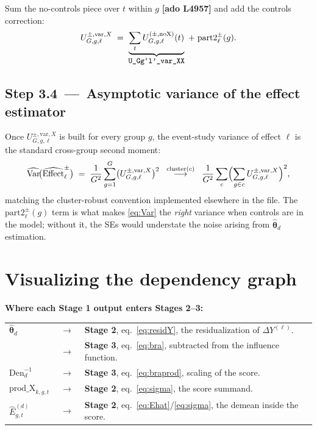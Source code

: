 \documentclass[11pt]{article}
\newcommand{\code}[1]{\texttt{\small #1}}
\newcommand{\Adoref}[1]{\textcolor{accent}{\footnotesize\textbf{[ado L#1]}}}
\newcommand{\1}{\mathbb{1}}
\newcommand{\thetad}{\widehat{\bm{\theta}}_d}
\begin{document}
Sum the no-controls piece over $t$ within $g$ \Adoref{4957} and add the
controls correction:
\begin{equation}
U^{\pm,\mathrm{var},X}_{G,g,\ell} \;=\; \underbrace{\sum_{t} U^{(\pm,\mathrm{noX})}_{G,g,\ell}(t)}_{\text{\code{U\_Gg`l'\_var\_XX}}} \;+\; \mathrm{part2}^{\pm}_{\ell}(g).
\label{eq:UvarX}
\end{equation}

\subsection*{Step 3.4 \,---\, Asymptotic variance of the effect estimator}

Once $U^{\pm,\mathrm{var},X}_{G,g,\ell}$ is built for every group $g$, the
event-study variance of effect $\ell$ is the standard cross-group second
moment:
\begin{equation}
\widehat{\mathrm{Var}}\!\bigl(\widehat{\mathrm{Effect}}^{\pm}_{\ell}\bigr) \;=\; \frac{1}{G^{2}}\sum_{g=1}^{G} \bigl(U^{\pm,\mathrm{var},X}_{G,g,\ell}\bigr)^{2}
\;\;\stackrel{\text{cluster}(c)}{\longrightarrow}\;\;
\frac{1}{G^{2}}\sum_{c} \Bigl(\sum_{g\in c} U^{\pm,\mathrm{var},X}_{G,g,\ell}\Bigr)^{2},
\label{eq:Var}
\end{equation}
matching the cluster-robust convention implemented elsewhere in the file. The
$\mathrm{part2}^{\pm}_{\ell}(g)$ term is what makes \eqref{eq:Var} the
\emph{right} variance when controls are in the model; without it, the SEs
would understate the noise arising from $\thetad$ estimation.

\section[Visualizing the dependency graph]{Visualizing the dependency graph}

\begin{tcolorbox}[colback=codebg, colframe=navy, boxrule=0.6pt, arc=1pt]
\textbf{Where each Stage 1 output enters Stages 2--3:}\\[2pt]
\begin{tabular}{@{}l@{\;\;}c@{\;\;}l@{}}
$\thetad$  &$\;\to\;$& \textbf{Stage 2}, eq.~\eqref{eq:residY}, the residualization of $\Delta Y^{(\ell)}$.\\
           &$\;\to\;$& \textbf{Stage 3}, eq.~\eqref{eq:bra}, subtracted from the influence function.\\[3pt]
$\mathrm{Den}_d^{-1}$ &$\;\to\;$& \textbf{Stage 3}, eq.~\eqref{eq:braprod}, scaling of the score.\\[3pt]
$\mathrm{prod\_X}_{k,g,t}$ &$\;\to\;$& \textbf{Stage 2}, eq.~\eqref{eq:sigma}, the score summand.\\[3pt]
$\widehat{E}^{(d)}_{g,t}$ &$\;\to\;$& \textbf{Stage 2}, eq.~\eqref{eq:Ehat}/\eqref{eq:sigma}, the demean inside the score.\\
\end{tabular}
\end{tcolorbox}
\end{document}
